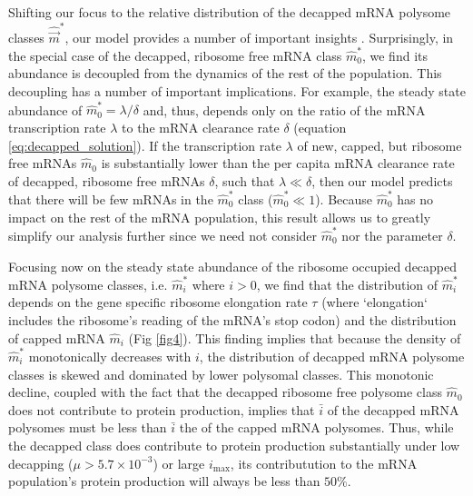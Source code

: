 \documentclass[10pt,letterpaper]{article}
\newcommand{\imax}{\ensuremath{{i_{\max}}}\xspace}
\newcommand{\mhat}{\ensuremath{\hat{m}}\xspace}
\newcommand{\mvec}{\ensuremath{\vec{m}}\xspace}
\newcommand{\mvechat}{\ensuremath{\hat{\mvec}}\xspace}
\newcommand{\mvechatstar}{\ensuremath{\mvechat^*}\xspace}
\newcommand{\MRL}{\ensuremath{\bar{i}}\xspace}
\begin{document}
Shifting our focus to the relative distribution of the decapped mRNA polysome classes \mvechatstar, our model provides a number of important insights .
Surprisingly, in the special case of the decapped, ribosome free mRNA class $\mhat_0^*$, we find its abundance is decoupled from the dynamics of the rest of the population.
  This decoupling has a number of important implications.
  For example, the steady state abundance of $\mhat_0^* = \lambda/\delta$ and, thus, depends only on the ratio of the mRNA transcription rate $\lambda$ to the mRNA clearance rate $\delta$ (equation \ref{eq:decapped_solution}).
  If the transcription rate $\lambda$ of new, capped, but ribosome free mRNAs $\mhat_0$ is substantially lower than the per capita mRNA clearance rate of decapped, ribosome free mRNAs $\delta$, such that  $\lambda \ll \delta$, then our model predicts that there will be few mRNAs in the $\mhat_0^*$ class ($\mhat_0^* \ll 1$).
  Because $\mhat^*_0$ has no impact on the rest of the mRNA population, this result allows us to greatly simplify our analysis further since we need not consider $\mhat_0^*$ nor the parameter $\delta$.

Focusing now on the steady state abundance of the ribosome occupied decapped mRNA polysome classes, i.e.  $\mhat_i^*$ where $i > 0$, we find that the distribution of $\mhat^*_i$  depends on the gene specific ribosome elongation rate $\tau$ (where `elongation`  includes the ribosome's reading of the mRNA's stop codon) and the distribution of capped mRNA $\mhat_i$ (Fig \ref{fig4}).
\label{item:protein_production} This finding implies that because the density of $\mhat^*_i$ monotonically decreases with $i$, the distribution of decapped mRNA polysome classes is skewed and dominated by lower polysomal classes.
  This monotonic decline, coupled with the fact that the decapped ribosome free polysome class $\mhat_0$ does not contribute to protein production, implies that \MRL of the decapped mRNA polysomes must be less than \MRL the of the capped mRNA polysomes.
  Thus, while the decapped class does contribute to protein production substantially under low decapping ($\mu> 5.7 \times 10^{-3}$) or large \imax, its contributution to the mRNA population's protein production will always be less than  $50\%$.
\end{document}
